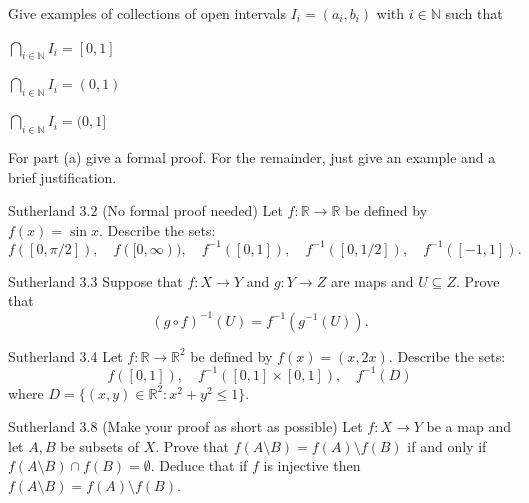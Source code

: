 \documentclass{homework}
\newcommand{\Reals}{\ensuremath{\mathbb R}}%
\newcommand{\Nats}{\ensuremath{\mathbb N}} %
\begin{document}
\begin{problems}
\problem Give examples of collections of open intervals $I_i = (a_i, b_i)$ with $i \in \Nats$ such that
\begin{subproblems}
\item $\bigcap_{i \in \Nats} I_i = [0,1]$
\item $\bigcap_{i \in \Nats} I_i = (0,1)$
\item $\bigcap_{i \in \Nats} I_i = (0,1]$
\end{subproblems}
For part (a) give a formal proof. For the remainder, just give an example and a brief
justification.
\subsol

\subsol

\subsol

\problem Sutherland 3.2 (No formal proof needed)
Let $f : \Reals \to \Reals$ be defined by $f(x) = \sin x$. Describe the sets:
\[
f([0, \pi/2]), \quad f([0,\infty)), \quad f^{-1}([0,1]), \quad f^{-1}([0,1/2]), \quad f^{-1}([-1,1]).
\]
\solution

\problem Sutherland 3.3
Suppose that $f : X \to Y$ and $g : Y \to Z$ are maps and $U \subseteq Z$.
Prove that
\[
(g \circ f)^{-1}(U) = f^{-1}(g^{-1}(U)).
\]
\solution

\problem Sutherland 3.4
Let $f : \Reals \to \Reals^2$ be defined by $f(x) = (x, 2x)$. Describe the sets:
\[
f([0,1]), \quad f^{-1}([0,1] \times [0,1]), \quad f^{-1}(D)
\]
where $D = \{(x,y) \in \Reals^2 : x^2 + y^2 \le 1\}$.
\solution

\problem Sutherland 3.8 (Make your proof as short as possible)
Let $f : X \to Y$ be a map and let $A, B$ be subsets of $X$. Prove
that $f(A \setminus B) = f(A) \setminus f(B)$ if and only if $f(A \setminus B) \cap f(B) = \emptyset$.
Deduce that if $f$ is injective then $f(A \setminus B) = f(A) \setminus f(B)$.
\solution

\end{problems}
\end{document}
